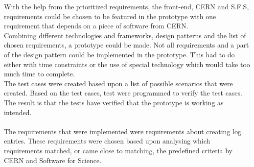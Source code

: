 \documentclass[paper=a4, fontsize=11pt,twoside]{scrartcl}	%
\begin{document}
With the help from the prioritized requirements, the front-end, CERN and S.F.S, requirements could be chosen to be featured in the prototype with one requirement that depends on a piece of software from CERN. \\
Combining different technologies and frameworks, design patterns and the list of chosen requirements, a prototype could be made. Not all requirements and a part of the design pattern could be implemented in the prototype. This had to do either with time constraints or the use of special technology which would take too much time to complete. \\
The test cases were created based upon a list of possible scenarios that were created. Based on the test cases, test were programmed to verify the test cases. The result is that the tests have verified that the prototype is working as intended.  \\ \\
The requirements that were implemented were requirements about creating log entries. These requirements were chosen based upon analysing which requirements matched, or came close to matching, the predefined criteria by CERN and Software for Science. \\





\newpage
\end{document}
